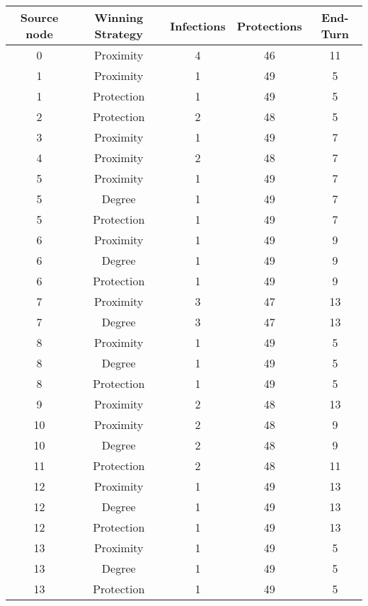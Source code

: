 \documentclass[results.tex]{subfiles}
\begin{document}
\begin{center}
  \begin{tabular}{| c || c | c | c | c |}
    \hline
    {\bfseries Source node} & {\bfseries Winning Strategy} & {\bfseries Infections} & {\bfseries Protections} & {\bfseries End-Turn} \\  %
    \hline\hline
    0 & Proximity & 4 & 46 & 11 \\ 
    \hline
    1 & Proximity & 1 & 49 & 5 \\ 
    \hline
    1 & Protection & 1 & 49 & 5 \\ 
    \hline
    2 & Protection & 2 & 48 & 5 \\ 
    \hline
    3 & Proximity & 1 & 49 & 7 \\ 
    \hline
    4 & Proximity & 2 & 48 & 7 \\ 
    \hline
    5 & Proximity & 1 & 49 & 7 \\ 
    \hline
    5 & Degree & 1 & 49 & 7 \\ 
    \hline
    5 & Protection & 1 & 49 & 7 \\ 
    \hline
    6 & Proximity & 1 & 49 & 9 \\ 
    \hline
    6 & Degree & 1 & 49 & 9 \\ 
    \hline
    6 & Protection & 1 & 49 & 9 \\ 
    \hline
    7 & Proximity & 3 & 47 & 13 \\ 
    \hline
    7 & Degree & 3 & 47 & 13 \\ 
    \hline
    8 & Proximity & 1 & 49 & 5 \\ 
    \hline
    8 & Degree & 1 & 49 & 5 \\ 
    \hline
    8 & Protection & 1 & 49 & 5 \\ 
    \hline
    9 & Proximity & 2 & 48 & 13 \\ 
    \hline
    10 & Proximity & 2 & 48 & 9 \\ 
    \hline
    10 & Degree & 2 & 48 & 9 \\ 
    \hline
    11 & Protection & 2 & 48 & 11 \\ 
    \hline
    12 & Proximity & 1 & 49 & 13 \\ 
    \hline
    12 & Degree & 1 & 49 & 13 \\ 
    \hline
    12 & Protection & 1 & 49 & 13 \\ 
    \hline
    13 & Proximity & 1 & 49 & 5 \\ 
    \hline
    13 & Degree & 1 & 49 & 5 \\ 
    \hline
    13 & Protection & 1 & 49 & 5 \\ 

\end{tabular}
\end{center}
\end{document}
